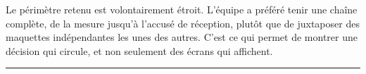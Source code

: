 \documentclass[11pt,a4paper]{article}
\begin{document}
\vspace{0.5cm}
\noindent Le p\'erim\`etre retenu est volontairement \'etroit. L'\'equipe a pr\'ef\'er\'e tenir une cha\^ine
compl\`ete, de la mesure jusqu'\`a l'accus\'e de r\'eception, plut\^ot que de juxtaposer des maquettes
ind\'ependantes les unes des autres. C'est ce qui permet de montrer une d\'ecision qui circule, et
non seulement des \'ecrans qui affichent.

\vspace{0.4cm}
\noindent\rule{\textwidth}{0.4pt}
\vspace{0.2cm}

\end{document}
